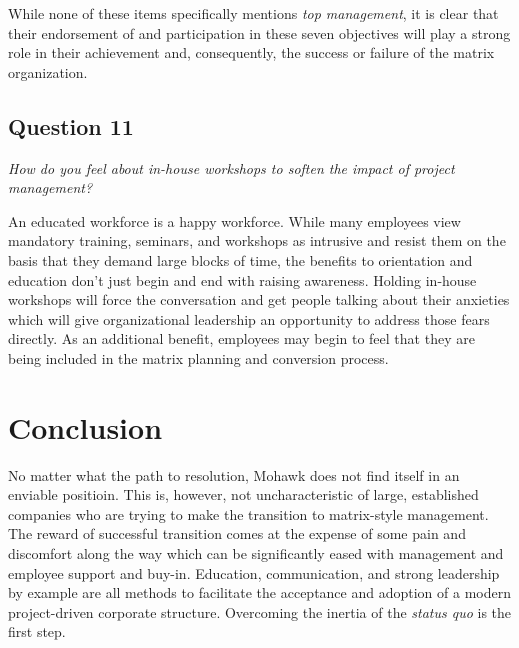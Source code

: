 \documentclass[letterpaper,10pt]{article}
\begin{document}
While none of these items specifically mentions \emph{top management}, it is clear that their endorsement of and participation in these seven objectives will play a strong role in their achievement and, consequently, the success or failure of the matrix organization.

\subsection{Question 11}
\emph{How do you feel about in-house workshops to soften the impact of project management?}\vspace*{1em}

An educated workforce is a happy workforce.  While many employees view mandatory training, seminars, and workshops as intrusive and resist them on the basis that they demand large blocks of time, the benefits to orientation and education don't just begin and end with raising awareness.  Holding in-house workshops will force the conversation and get people talking about their anxieties which will give organizational leadership an opportunity to address those fears directly.  As an additional benefit, employees may begin to feel that they are being included in the matrix planning and conversion process.

\section{Conclusion}
No matter what the path to resolution, Mohawk does not find itself in an enviable positioin.  This is, however, not uncharacteristic of large, established companies who are trying to make the transition to matrix-style management.  The reward of successful transition comes at the expense of some pain and discomfort along the way which can be significantly eased with management and employee support and buy-in.  Education, communication, and strong leadership by example are all methods to facilitate the acceptance and adoption of a modern project-driven corporate structure.  Overcoming the inertia of the \emph{status quo} is the first step.
\end{document}
